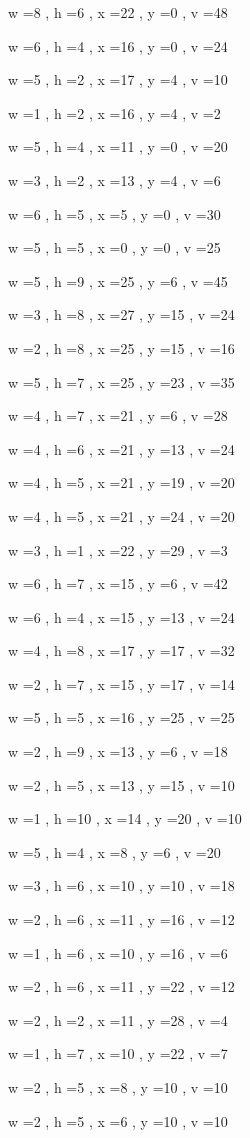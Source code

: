 \documentclass[11pt]{article}
\begin{document}
w =8 , h =6 , x =22 , y =0 , v =48
\par
w =6 , h =4 , x =16 , y =0 , v =24
\par
w =5 , h =2 , x =17 , y =4 , v =10
\par
w =1 , h =2 , x =16 , y =4 , v =2
\par
w =5 , h =4 , x =11 , y =0 , v =20
\par
w =3 , h =2 , x =13 , y =4 , v =6
\par
w =6 , h =5 , x =5 , y =0 , v =30
\par
w =5 , h =5 , x =0 , y =0 , v =25
\par
w =5 , h =9 , x =25 , y =6 , v =45
\par
w =3 , h =8 , x =27 , y =15 , v =24
\par
w =2 , h =8 , x =25 , y =15 , v =16
\par
w =5 , h =7 , x =25 , y =23 , v =35
\par
w =4 , h =7 , x =21 , y =6 , v =28
\par
w =4 , h =6 , x =21 , y =13 , v =24
\par
w =4 , h =5 , x =21 , y =19 , v =20
\par
w =4 , h =5 , x =21 , y =24 , v =20
\par
w =3 , h =1 , x =22 , y =29 , v =3
\par
w =6 , h =7 , x =15 , y =6 , v =42
\par
w =6 , h =4 , x =15 , y =13 , v =24
\par
w =4 , h =8 , x =17 , y =17 , v =32
\par
w =2 , h =7 , x =15 , y =17 , v =14
\par
w =5 , h =5 , x =16 , y =25 , v =25
\par
w =2 , h =9 , x =13 , y =6 , v =18
\par
w =2 , h =5 , x =13 , y =15 , v =10
\par
w =1 , h =10 , x =14 , y =20 , v =10
\par
w =5 , h =4 , x =8 , y =6 , v =20
\par
w =3 , h =6 , x =10 , y =10 , v =18
\par
w =2 , h =6 , x =11 , y =16 , v =12
\par
w =1 , h =6 , x =10 , y =16 , v =6
\par
w =2 , h =6 , x =11 , y =22 , v =12
\par
w =2 , h =2 , x =11 , y =28 , v =4
\par
w =1 , h =7 , x =10 , y =22 , v =7
\par
w =2 , h =5 , x =8 , y =10 , v =10
\par
w =2 , h =5 , x =6 , y =10 , v =10
\par
\newpage
\end{document}
